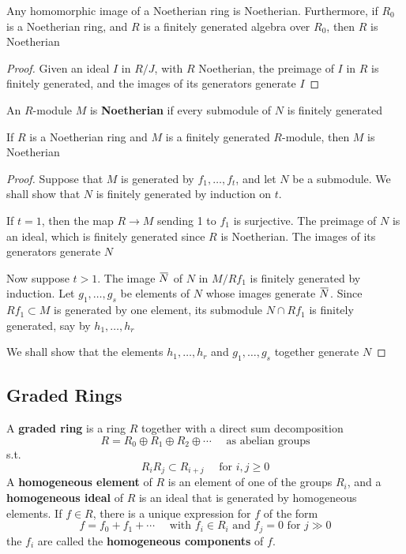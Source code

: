 \documentclass[11pt]{article}
\begin{document}
\begin{corollary}[]
Any homomorphic image of a Noetherian ring is Noetherian. Furthermore, if
\(R_0\) is a Noetherian ring, and \(R\) is a finitely generated algebra over
\(R_0\), then \(R\) is Noetherian
\end{corollary}

\begin{proof}
Given an ideal \(I\) in \(R/J\), with \(R\) Noetherian, the preimage of \(I\)
in \(R\) is finitely generated, and the images of its generators generate \(I\)
\end{proof}

An \(R\)-module \(M\) is \textbf{Noetherian} if every submodule of \(N\) is finitely
generated

\begin{proposition}[]
\label{prop1.4}
If \(R\) is a Noetherian ring and \(M\) is a finitely generated \(R\)-module,
then \(M\) is Noetherian
\end{proposition}

\begin{proof}
Suppose that \(M\) is generated by \(f_1,\dots,f_t\), and let \(N\) be a
submodule. We shall show that \(N\) is finitely generated by induction on
\(t\).

If \(t=1\), then the map \(R\to M\) sending 1 to \(f_1\) is surjective. The
preimage of \(N\) is an ideal, which is finitely generated since \(R\) is
Noetherian. The images of its generators generate \(N\)

Now suppose \(t>1\). The image \(\bbar{N}\) of \(N\) in \(M/Rf_1\) is
finitely generated by induction. Let \(g_1,\dots,g_s\) be elements of \(N\)
whose images generate \(\bbar{N}\). Since \(Rf_1\subset M\)  is generated by
one element, its submodule \(N\cap Rf_1\) is finitely generated, say by
\(h_1,\dots,h_r\)

We shall show that the elements \(h_1,\dots,h_r\) and \(g_1,\dots,g_s\)
together generate \(N\)
\end{proof}
\subsection{Graded Rings}
\label{sec:org6e49bb0}
A \textbf{graded ring} is a ring \(R\) together with a direct sum decomposition
\begin{equation*}
R=R_0\oplus R_1\oplus R_2\oplus\cdots\quad\text{ as abelian groups}
\end{equation*}
s.t.
\begin{equation*}
R_iR_j\subset R_{i+j}\quad\text{ for }i,j\ge0
\end{equation*}
A \textbf{homogeneous element} of \(R\) is an element of one of the groups \(R_i\),
and a \textbf{homogeneous ideal} of \(R\) is an ideal that is generated by homogeneous
elements. If \(f\in R\), there is a unique expression for \(f\) of the form
\begin{equation*}
f=f_0+f_1+\cdots\quad\text{ with } f_i\in R_i\text{ and }f_j=0\text{ for }j\gg0
\end{equation*}
the \(f_i\) are called the \textbf{homogeneous components} of \(f\).
\end{document}
